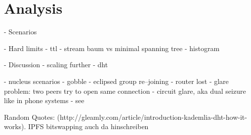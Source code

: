 \chapter{Analysis}

- Scenarios


- Hard limits
    - ttl
    - stream baum vs minimal spanning tree
        - histogram

- Discussion
- scaling further
    - dht

- nucleus scenarios
    - gobble
    - eclipsed group re–joining
    - router lost
    - glare problem: two peers try to open same connection
        - circuit glare, aka dual seizure like in phone systems
        - see \cite[pp. 194-194]{signaling-systems-book}


Random Quotes:
(http://gleamly.com/article/introduction-kademlia-dht-how-it-works). IPFS bitswapping auch da hinschreiben


\newpage

\newpage

\newpage
